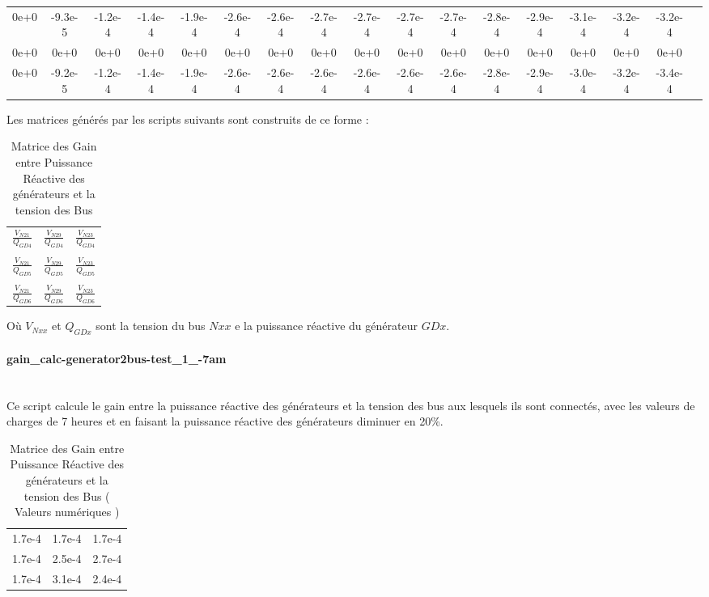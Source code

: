 \begin{table}[H]
{\begin{tabular}{ccccccccccccccccc}
			0e+0& -9.3e-5& -1.2e-4& -1.4e-4& -1.9e-4& -2.6e-4& -2.6e-4& -2.7e-4& -2.7e-4& -2.7e-4& -2.7e-4& -2.8e-4& -2.9e-4& -3.1e-4& -3.2e-4& -3.2e-4\\
			0e+0& 0e+0& 0e+0& 0e+0& 0e+0& 0e+0& 0e+0& 0e+0& 0e+0& 0e+0& 0e+0& 0e+0& 0e+0& 0e+0& 0e+0& 0e+0\\
			0e+0& -9.2e-5& -1.2e-4& -1.4e-4& -1.9e-4& -2.6e-4& -2.6e-4& -2.6e-4& -2.6e-4& -2.6e-4& -2.6e-4& -2.8e-4& -2.9e-4& -3.0e-4& -3.2e-4& -3.4e-4
			\\
	\end{tabular}}
\end{table} 

Les matrices générés par les scripts suivants sont construits de ce forme :

\begin{table}[H]
	\captionsetup{justification=centering,margin=2cm}
	\caption{Matrice des Gain entre Puissance Réactive des générateurs et la tension des Bus}
	\centering
	\begin{tabular}{ccc}
		$ \frac{V_{N21}}{Q_{GD4}} $&$ \frac{V_{N29}}{Q_{GD4}} $&$ \frac{V_{N23}}{Q_{GD4}} $\\
		&&\\
		$ \frac{V_{N21}}{Q_{GD5}} $&$ \frac{V_{N29}}{Q_{GD5}} $&$ \frac{V_{N23}}{Q_{GD5}} $\\
		&&\\
		$ \frac{V_{N21}}{Q_{GD6}} $&$ \frac{V_{N29}}{Q_{GD6}} $&$ \frac{V_{N23}}{Q_{GD6}} $\\
	\end{tabular}
\end{table}

Où $ V_{Nxx} $ et $ Q_{GDx} $ sont la tension du bus $ Nxx $ e la puissance réactive du générateur $ GDx $.
\paragraph{gain\_calc-generator2bus-test\_1\_-7am\\\\}
Ce script calcule le gain entre la puissance réactive des générateurs et la tension des bus aux lesquels ils sont connectés, avec les valeurs de charges de 7 heures et en faisant la puissance réactive des générateurs diminuer en 20\%.
\begin{table}[H]
	\captionsetup{justification=centering,margin=2cm}
	\caption{Matrice des Gain entre Puissance Réactive des générateurs et la tension des Bus ( Valeurs numériques )}
	\centering
	\begin{tabular}{ccc}
		1.7e-4&1.7e-4&1.7e-4\\
		1.7e-4&2.5e-4&2.7e-4\\
		1.7e-4&3.1e-4&2.4e-4\\
	\end{tabular}
\end{table}

